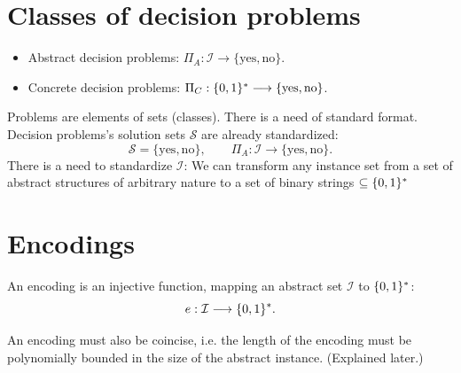 \section{Classes of decision problems}
\begin{itemize}
\item Abstract decision problems: $\Pi_A:\mathcal I\longrightarrow\{\mathrm{yes},\mathrm{no}\}$.
\item Concrete decision problems: $\Pi_C:\{0,1\}^*\longrightarrow\{\mathrm{yes},\mathrm{no}\}$.
\end{itemize}


Problems are elements of sets (classes). There is a need of standard format.
Decision problems's solution sets $\mathcal S$ are already standardized:
\[
\mathcal S=\{\mathrm{yes},\mathrm{no}\},\qquad\Pi_A:\mathcal I\longrightarrow\{\mathrm{yes},\mathrm{no}\}.
\]
There is a need to standardize $\mathcal I$:
We can transform any instance set from a set of abstract structures of arbitrary nature to a set of binary strings $\subseteq\{0,1\}^*$ 


\section{Encodings} 
\begin{notesdefinition}
An encoding is an injective function, mapping an abstract set $\mathcal I$ to $\{0,1\}^*$:
\[
e:\mathcal I\longrightarrow\{0,1\}^*.
\]

An encoding must also be coincise, i.e. the length of the encoding must be polynomially bounded in the size of the abstract instance. (Explained later.)
\end{notesdefinition}
